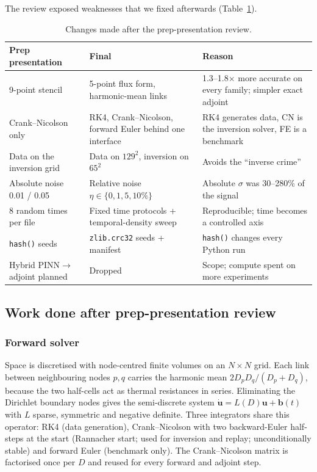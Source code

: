 \documentclass[twoside,english]{article}
\begin{document}
The review exposed weaknesses that we fixed afterwards (Table~\ref{tab:changes}).

\begin{table}[H]
\centering\footnotesize
\begin{tabular}{p{4.3cm}p{4.3cm}p{6.5cm}}
\toprule
Prep presentation & Final & Reason \\
\midrule
9-point stencil & 5-point flux form, harmonic-mean links & 1.3--1.8$\times$ more accurate on every family; simpler exact adjoint \\
Crank--Nicolson only & RK4, Crank--Nicolson, forward Euler behind one interface & RK4 generates data, CN is the inversion solver, FE is a benchmark \\
Data on the inversion grid & Data on $129^2$, inversion on $65^2$ & Avoids the ``inverse crime'' \\
Absolute noise 0.01 / 0.05 & Relative noise $\eta\in\{0,1,5,10\%\}$ & Absolute $\sigma$ was 30--280\% of the signal \\
8 random times per file & Fixed time protocols + temporal-density sweep & Reproducible; time becomes a controlled axis \\
\texttt{hash()} seeds & \texttt{zlib.crc32} seeds + manifest & \texttt{hash()} changes every Python run \\
Hybrid PINN$\rightarrow$adjoint planned & Dropped & Scope; compute spent on more experiments \\
\bottomrule
\end{tabular}
\caption{Changes made after the prep-presentation review.}\label{tab:changes}
\end{table}

\subsection{Work done after prep-presentation review}

\subsubsection{Forward solver}
Space is discretised with node-centred finite volumes on an $N\times N$ grid. Each link between neighbouring nodes $p,q$ carries the harmonic mean $2D_pD_q/(D_p+D_q)$, because the two half-cells act as thermal resistances in series. Eliminating the Dirichlet boundary nodes gives the semi-discrete system $\dot{\mathbf u}=L(D)\mathbf u+\mathbf b(t)$ with $L$ sparse, symmetric and negative definite. Three integrators share this operator: RK4 (data generation), Crank--Nicolson with two backward-Euler half-steps at the start (Rannacher start; used for inversion and replay; unconditionally stable) and forward Euler (benchmark only). The Crank--Nicolson matrix is factorised once per $D$ and reused for every forward and adjoint step.
\end{document}
